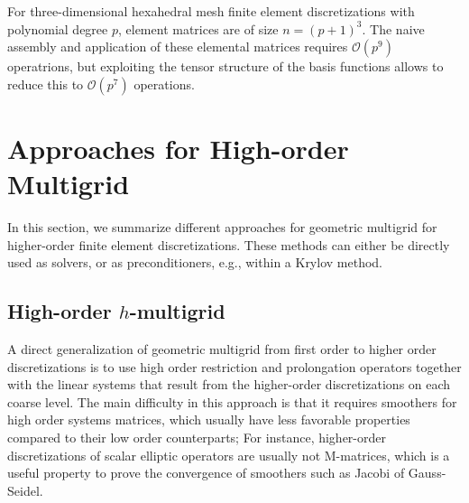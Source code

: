 \documentclass[times]{nlaauth}
\begin{document}
For three-dimensional hexahedral mesh finite element discretizations
with polynomial degree $p$, element matrices are of size
$n=(p+1)^3$. The naive assembly and application of these elemental
matrices requires $\mathcal O(p^9)$ operatrions, but exploiting the
tensor structure of the basis functions allows to reduce this to
$\mathcal O(p^7)$ operations.


\section{Approaches for High-order Multigrid}
\label{sec:approaches}

In this section, we summarize different approaches for geometric
multigrid for higher-order finite element discretizations. These
methods can either be directly used as solvers, or as preconditioners,
e.g., within a Krylov method.


\subsection{High-order $h$-multigrid}\label{subsec:h}
A direct generalization of geometric multigrid from first order to
higher order discretizations is to use high order restriction and
prolongation operators together with the linear systems that result
from the higher-order discretizations on each coarse level.  The main
difficulty in this approach is that it requires smoothers for high
order systems matrices, which usually have less favorable properties
compared to their low order counterparts; For instance, higher-order
discretizations of scalar elliptic operators are usually not
M-matrices, which is a useful property to prove the convergence of
smoothers such as Jacobi of Gauss-Seidel.
\end{document}
